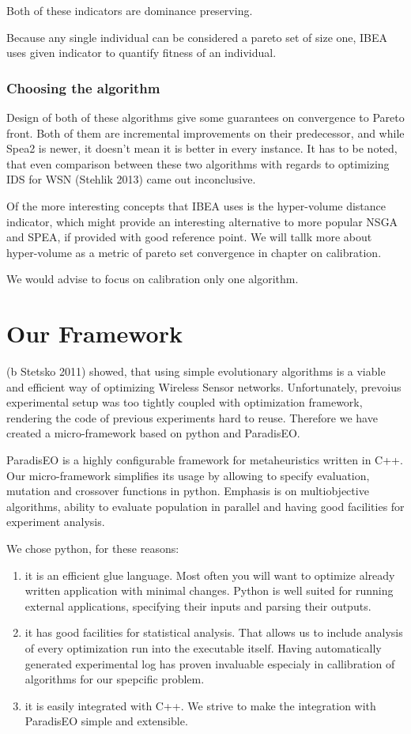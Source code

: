 \documentclass[12pt,oneside,draft]{fithesis2}
\begin{document}
Both of these indicators are dominance preserving.

Because any single individual can be considered a pareto set of size one, IBEA uses given indicator to quantify fitness of an individual.



\subsection{Choosing the algorithm}
Design of both of these algorithms give some guarantees on convergence to Pareto front. Both of them are incremental improvements on their predecessor, and while Spea2 is newer, it doesn't mean it is better in every instance. It has to be noted, that even comparison between these two algorithms with regards to optimizing IDS for WSN (Stehlik 2013) came out inconclusive. 

Of the more interesting concepts that IBEA uses is the hyper-volume distance indicator, which might provide an interesting alternative to more popular NSGA and SPEA, if provided with good reference point. We will tallk more about hyper-volume as a metric of pareto set convergence in chapter on calibration.

We would advise to focus on calibration only one algorithm.

\chapter{Our Framework}

(b Stetsko 2011) showed, that using simple evolutionary algorithms is a viable and efficient way of optimizing Wireless Sensor networks. Unfortunately, prevoius experimental setup was too tightly coupled with optimization framework, rendering the code of previous experiments hard to reuse. Therefore we have created a micro-framework based on python and ParadisEO. 

ParadisEO is a highly configurable framework for metaheuristics written in C++. Our micro-framework simplifies its usage by allowing to specify evaluation, mutation and crossover functions in python. Emphasis is on multiobjective algorithms, ability to evaluate population in parallel and having good facilities for experiment analysis.

We chose python, for these reasons:
\begin{enumerate}
\item it is an efficient glue language. 
Most often you will want to optimize already written application with minimal changes. Python is well suited for running external applications, specifying their inputs and parsing their outputs.
 
\item it has good facilities for statistical analysis.
That allows us to include analysis of every optimization run into the executable itself. Having automatically generated experimental log has proven invaluable especialy in callibration of algorithms for our spepcific problem.

\item it is easily integrated with C++.
We strive to make the integration with ParadisEO simple and extensible. 
\end{enumerate}
\end{document}
